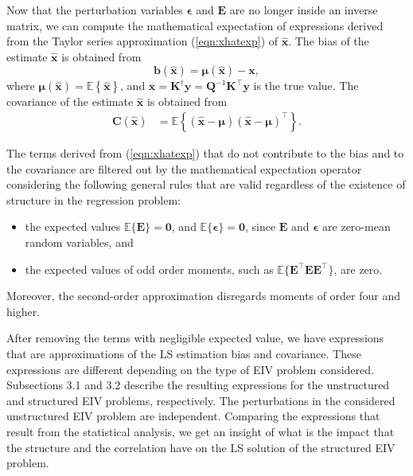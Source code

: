 Now that the perturbation variables $\bm{\epsilon}$ and $\mathbf{E}$ are no longer inside an inverse matrix, we can compute the mathematical expectation of expressions derived from the Taylor series approximation (\ref{eqn:xhatexp}) of $\widehat{\mathbf{x}}$. 
The bias of the estimate $\widehat{\mathbf{x}}$ is obtained from
\begin{equation} \mathbf{b} \left(\widehat{\mathbf{x}} \right) = \bm{\mu}\left(\widehat{\mathbf{x}} \right) - \mathbf{x}, \label{eqn:biasdef} \end{equation}
where $\bm{\mu} \left(\widehat{\mathbf{x}} \right) = \mathbb{E} \left\{ \widehat{\mathbf{x}} \right\}$, and $\mathbf{x} = \mathbf{K}^\dagger \mathbf{y} = \mathbf{Q}^{-1} \mathbf{K}^\top \mathbf{y}$ is the true value.
The covariance of the estimate $\widehat{\mathbf{x}}$ is obtained from
\begin{equation} \begin{aligned} \mathbf{C} \left( \widehat{\mathbf{x}} \right) & = \mathbb{E} \left\{ \left( \widehat{\mathbf{x}} - \bm{\mu} \right) \left( \widehat{\mathbf{x}} - \bm{\mu} \right)^\top \right\} . \end{aligned} \label{eqn:covdef} \end{equation} 

The terms derived from (\ref{eqn:xhatexp}) that do not contribute to the bias and to the covariance are filtered out by the mathematical expectation operator considering the following general rules that are valid regardless of the existence of structure in the regression problem: 
\begin{itemize}
	\item the expected values $\mathbb{E} \{ \mathbf{E} \} = \mathbf{0}$, and $\mathbb{E} \{ \bm{\epsilon} \} = \mathbf{0}$, since $\mathbf{E}$ and $\bm{\epsilon}$ are zero-mean random variables, and
	\item the expected values of odd order moments, such as $\mathbb{E} \{ \mathbf{E}^\top \mathbf{E} \mathbf{E}^\top \}$, are zero.
\end{itemize}
Moreover, the second-order approximation disregards moments of order four and higher.

After removing the terms with negligible expected value, we have expressions that are approximations of the LS estimation bias and covariance. 
These expressions are different depending on the type of EIV problem considered.
Subsections 3.1 and 3.2 describe the resulting expressions for the unstructured and structured EIV problems, respectively.
The perturbations in the considered unstructured EIV problem are independent.
Comparing the expressions that result from the statistical analysis, we get an insight of what is the impact that the structure and the correlation have on the LS solution of the structured EIV problem.


